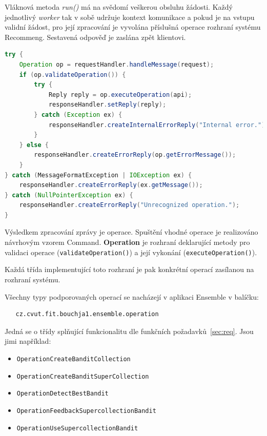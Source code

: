 \documentclass[thesis=M,czech]{FITthesis}[2014/05/07]
\begin{document}
Vláknová metoda \emph{run()} má na svědomí veškerou obsluhu žádosti. Každý jednotlivý \emph{worker} tak v sobě udržuje kontext komunikace a pokud je na vstupu validní žádost, pro její zpracování je vyvolána příslušná operace rozhraní systému Recommeng. Sestavená odpověď je zaslána zpět klientovi.

\begin{lstlisting}[language=java]
try {
    Operation op = requestHandler.handleMessage(request);
    if (op.validateOperation()) {
        try {
            Reply reply = op.executeOperation(api);
            responseHandler.setReply(reply);
        } catch (Exception ex) {
            responseHandler.createInternalErrorReply("Internal error.");
        }
    } else {
        responseHandler.createErrorReply(op.getErrorMessage());
    }
} catch (MessageFormatException | IOException ex) {
    responseHandler.createErrorReply(ex.getMessage());
} catch (NullPointerException ex) {
    responseHandler.createErrorReply("Unrecognized operation.");
}
\end{lstlisting}

Výsledkem zpracování zprávy je operace. Spuštění vhodné operace je realizováno návrhovým vzorem Command. \textbf{Operation} je rozhraní deklarující metody pro validaci operace (\texttt{validateOperation()}) a její vykonání (\texttt{executeOperation()}).

Každá třída implementující toto rozhraní je pak konkrétní operací zasílanou na rozhraní systému. 

Všechny typy podporovaných operací se nacházejí v aplikaci Ensemble v balíčku:

\begin{verbatim}
   cz.cvut.fit.bouchja1.ensemble.operation
\end{verbatim}

Jedná se o třídy splňující funkcionalitu dle funkčních požadavků~\ref{sec:req}. Jsou jimi například:

\begin{itemize}
	\item \texttt{OperationCreateBanditCollection}
	\item \texttt{OperationCreateBanditSuperCollection}	
	\item \texttt{OperationDetectBestBandit}
	\item \texttt{OperationFeedbackSupercollectionBandit}
	\item \texttt{OperationUseSupercollectionBandit}			
\end{itemize}
\end{document}
